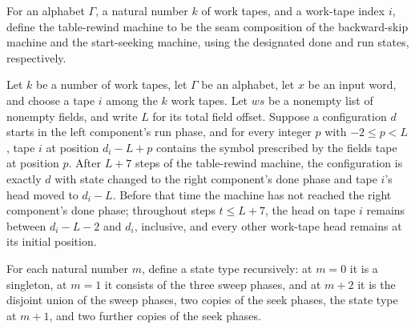 \begin{definition}
\label{Turing.tableRewindTM}
\leanok
{}
For an alphabet $\Gamma$, a natural number $k$ of work tapes, and a work-tape index $i$,
define the table-rewind machine to be the seam composition of the backward-skip machine
and the start-seeking machine, using the designated done and run states, respectively.
\end{definition}

\begin{theorem}
\label{Turing.tableRewindTM_run_ofCfg}
\leanok
{}
Let $k$ be a number of work tapes, let $\Gamma$ be an alphabet, let $x$ be an input
word, and choose a tape $i$ among the $k$ work tapes. Let $ws$ be a nonempty list of
nonempty fields, and write $L$ for its total field offset. Suppose a configuration $d$
starts in the left component's run phase, and for every integer $p$ with $-2 \le p < L$,
tape $i$ at position $d_i-L+p$ contains the symbol prescribed by the fields tape at
position $p$. After $L+7$ steps of the table-rewind machine, the configuration is
exactly $d$ with state changed to the right component's done phase and tape $i$'s head
moved to $d_i-L$. Before that time the machine has not reached the right component's
done phase; throughout steps $t \le L+7$, the head on tape $i$ remains between $d_i-L-2$
and $d_i$, inclusive, and every other work-tape head remains at its initial position.
\end{theorem}

\begin{definition}
\label{Turing.rt_copyState}
\leanok
{}
For each natural number $m$, define a state type recursively: at $m=0$ it is a
singleton, at $m=1$ it consists of the three sweep phases, and at $m+2$ it is the
disjoint union of the sweep phases, two copies of the seek phases, the state type at
$m+1$, and two further copies of the seek phases.
\end{definition}

